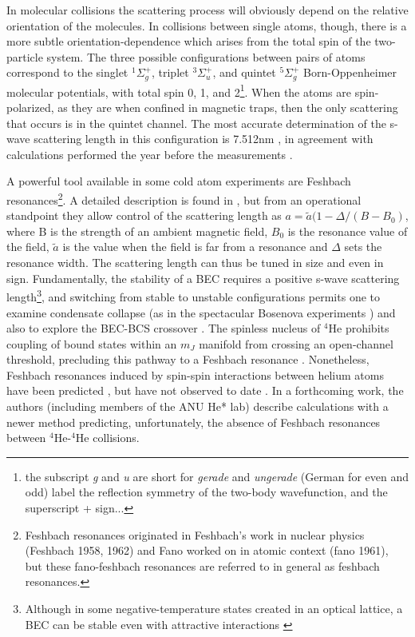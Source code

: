 	In molecular collisions the scattering process will obviously depend on the relative orientation of the molecules.
	In collisions between single atoms, though, there is a more subtle orientation-dependence which arises from the total spin of the two-particle system.
	The three possible configurations between pairs of \mhe atoms correspond to the singlet $^1\Sigma_g^+$, triplet $^3\Sigma_u^+$, and quintet $^5\Sigma_g^+$ Born-Oppenheimer molecular potentials, with total spin 0, 1, and 2\footnote{the subscript \emph{g} and \emph{u} are short for \emph{gerade} and \emph{ungerade} (German for even and odd) label the reflection symmetry of the two-body wavefunction, and the superscript + sign...}.
	When the atoms are spin-polarized, as they are when confined in magnetic traps, then the only scattering that occurs is in the quintet channel.
	The most accurate determination of the s-wave scattering length in this configuration is 7.512nm \cite{moal06}, in agreement with calculations performed the year before the measurements \cite{przybytek05}.
	
	A powerful tool available in some cold atom experiments are Feshbach resonances\footnote{Feshbach resonances originated in Feshbach's work in nuclear physics (Feshbach 1958, 1962) and Fano worked on in atomic context (fano 1961), but these fano-feshbach resonances are referred to in general as feshbach resonances.
	}.
	A detailed description is found in \cite{Chin10}, but from an operational standpoint they allow control of the scattering length as $a = \tilde{a}(1-\Delta/(B-B_0)$, where B is the strength of an ambient magnetic field, $B_0$ is the resonance value of the field, $\tilde{a}$ is the value when the field is far from a resonance and $\Delta$ sets the resonance width.
	The scattering length can thus be tuned in size and even in sign.
	Fundamentally, the stability of a BEC requires a positive s-wave scattering length\footnote{Although in some negative-temperature states created in an optical lattice, a BEC can be stable even with attractive interactions \cite{Braun13}}, and switching from stable to unstable configurations permits one to examine condensate collapse (as in the spectacular Bosenova experiments \cite{papers}) and also to explore the BEC-BCS crossover \cite{papers}.
	The spinless nucleus of $^4$He prohibits coupling of bound states within an $m_J$ manifold from crossing an open-channel threshold, precluding this pathway to a Feshbach resonance \cite{goosen10}.
	Nonetheless, Feshbach resonances induced by spin-spin interactions between helium atoms have been predicted \cite{venturi99, goosen10}, but have not observed to date \cite{borbely12}.
	In a forthcoming work, the authors (including members of the ANU He* lab) describe calculations with a newer method predicting, unfortunately, the absence of Feshbach resonances between $^4$He-$^4$He collisions.
	
